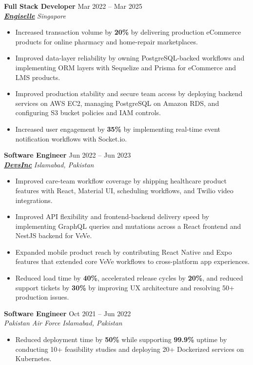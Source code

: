 \documentclass[9pt,letterpaper]{article}
\newcommand{\role}[4]{\textbf{#1} \hfill #2 \\
\textit{#3} \hfill \textit{#4}\\[-4pt]}
\begin{document}
\role{Full Stack Developer}{Mar 2022 -- Mar 2025}{\href{https://www.engiselle.com/}{\textbf{\underline{Engiselle}}}}{Singapore}
\begin{itemize}[leftmargin=*, itemsep=0pt, topsep=0pt, partopsep=0pt, parsep=0pt, after=\vspace{2pt}]
  \item Increased transaction volume by \textbf{20\%} by delivering production eCommerce products for online pharmacy and home-repair marketplaces.
  \item Improved data-layer reliability by owning PostgreSQL-backed workflows and implementing ORM layers with Sequelize and Prisma for eCommerce and LMS products.
  \item Improved production stability and secure team access by deploying backend services on AWS EC2, managing PostgreSQL on Amazon RDS, and configuring S3 bucket policies and IAM controls.
  \item Increased user engagement by \textbf{35\%} by implementing real-time event notification workflows with Socket.io.
\end{itemize}

\role{Software Engineer}{Jun 2022 -- Jun 2023}{\href{https://www.devsinc.com/}{\textbf{\underline{DevsInc}}}}{Islamabad, Pakistan}
\begin{itemize}[leftmargin=*, itemsep=0pt, topsep=0pt, partopsep=0pt, parsep=0pt, after=\vspace{2pt}]
  \item Improved care-team workflow coverage by shipping healthcare product features with React, Material UI, scheduling workflows, and Twilio video integrations.
  \item Improved API flexibility and frontend-backend delivery speed by implementing GraphQL queries and mutations across a React frontend and NestJS backend for VeVe.
  \item Expanded mobile product reach by contributing React Native and Expo features that extended core VeVe workflows to cross-platform app experiences.
  \item Reduced load time by \textbf{40\%}, accelerated release cycles by \textbf{20\%}, and reduced support tickets by \textbf{30\%} by improving UX architecture and resolving 50+ production issues.
\end{itemize}

\role{Software Engineer}{Oct 2021 -- Jun 2022}{Pakistan Air Force}{Islamabad, Pakistan}
\begin{itemize}[leftmargin=*, itemsep=0pt, topsep=0pt, partopsep=0pt, parsep=0pt, after=\vspace{2pt}]
  \item Reduced deployment time by \textbf{50\%} while supporting \textbf{99.9\%} uptime by conducting 10+ feasibility studies and deploying 20+ Dockerized services on Kubernetes.
\end{itemize}
\end{document}
